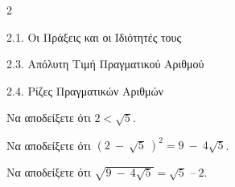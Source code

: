 \begin{ylh}{2}
    \item 2.1. Οι Πράξεις και οι Ιδιότητές τους
    \item 2.3. Απόλυτη Τιμή Πραγματικού Αριθμού
    \item 2.4. Ρίζες Πραγματικών Αριθμών
\end{ylh}

\begin{alist}
\item Να αποδείξετε ότι $2 < \sqrt{5}$.
\item Να αποδείξετε ότι $\left( 2\  - \ \sqrt{5}\  \right)^{2} = 9\  - \ 4\sqrt{5}$.
\item Να αποδείξετε ότι $\sqrt{9\  - \ 4\sqrt{5}} = \sqrt{5}$ $–\ 2$.
\end{alist}

